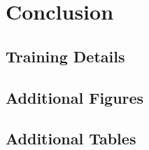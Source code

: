 \documentclass[12pt,letterpaper]{article}
\begin{document}
\section{Conclusion}


\makereference






\clearpage
\makeappendix

\subsection{Training Details}

\subsection{Additional Figures}

\subsection{Additional Tables}
\end{document}
